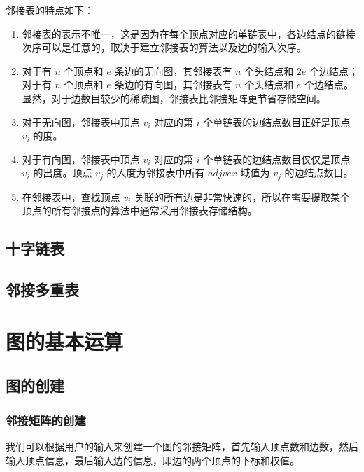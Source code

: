 \documentclass[lang=cn,newtx,10pt,scheme=chinese]{elegantbook}
\begin{document}
邻接表的特点如下：

\begin{enumerate}
  \item 邻接表的表示不唯一，这是因为在每个顶点对应的单链表中，各边结点的链接次序可以是任意的，取决于建立邻接表的算法以及边的输入次序。
  
  \item 对于有 $n$ 个顶点和 $e$ 条边的无向图，其邻接表有 $n$ 个头结点和 $2e$ 个边结点；对于有 $n$ 个顶点和 $e$ 条边的有向图，其邻接表有 $n$ 个头结点和 $e$ 个边结点。显然，对于边数目较少的稀疏图，邻接表比邻接矩阵更节省存储空间。
  
  \item 对于无向图，邻接表中顶点 $v_i$ 对应的第 $i$ 个单链表的边结点数目正好是顶点 $v_i$ 的度。
  
  \item 对于有向图，邻接表中顶点 $v_i$ 对应的第 $i$ 个单链表的边结点数目仅仅是顶点 $v_i$ 的出度。顶点 $v_j$ 的入度为邻接表中所有 $adjvex$ 域值为 $v_j$ 的边结点数目。
  
  \item 在邻接表中，查找顶点 $v_i$ 关联的所有边是非常快速的，所以在需要提取某个顶点的所有邻接点的算法中通常采用邻接表存储结构。
\end{enumerate}
\subsection{十字链表}

\subsection{邻接多重表}

\section{图的基本运算}


\subsection{图的创建}

\subsubsection{邻接矩阵的创建}

我们可以根据用户的输入来创建一个图的邻接矩阵，首先输入顶点数和边数，然后输入顶点信息，最后输入边的信息，即边的两个顶点的下标和权值。
\end{document}

